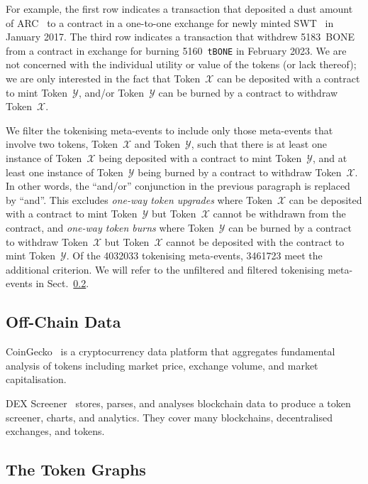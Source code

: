 For example, the first row indicates a transaction that deposited a
dust amount of ARC~\cite{arcade-city-xx} to a contract in a one-to-one
exchange for newly minted SWT~\cite{swarm-city-xx} in January 2017.
The third row indicates a transaction that withdrew
\num{5183}~{BONE}~\cite{shiba-inu-xx} from a contract in exchange for
burning \num{5160}~\texttt{tBONE} in February 2023.  We are not
concerned with the individual utility or value of the tokens (or lack
thereof); we are only interested in the fact that Token~$\mathcal{X}$
can be deposited with a contract to mint Token~$\mathcal{Y}$, and/or
Token~$\mathcal{Y}$ can be burned by a contract to withdraw
Token~$\mathcal{X}$.

We filter the tokenising meta-events to include only those meta-events
that involve two tokens, Token~$\mathcal{X}$ and Token~$\mathcal{Y}$,
such that there is at least one instance of Token~$\mathcal{X}$ being
deposited with a contract to mint Token~$\mathcal{Y}$, and at least
one instance of Token~$\mathcal{Y}$ being burned by a contract to
withdraw Token~$\mathcal{X}$.  In other words, the ``and/or''
conjunction in the previous paragraph is replaced by ``and''.  This
excludes \textit{one-way token upgrades} where Token~$\mathcal{X}$ can
be deposited with a contract to mint Token~$\mathcal{Y}$ but
Token~$\mathcal{X}$ cannot be withdrawn from the contract, and
\textit{one-way token burns} where Token~$\mathcal{Y}$ can be burned
by a contract to withdraw Token~$\mathcal{X}$ but Token~$\mathcal{X}$
cannot be deposited with the contract to mint Token~$\mathcal{Y}$.  Of
the \num{4032033} tokenising meta-events, \num{3461723} meet the
additional criterion.  We will refer to the unfiltered and filtered
tokenising meta-events in Sect.~\ref{sec:data-token-graphs}.

\subsection{Off-Chain Data}\label{sec:data-off-chain}

CoinGecko~\cite{gecko-labs-xx} is a cryptocurrency data platform that
aggregates fundamental analysis of tokens including market price,
exchange volume, and market capitalisation.

DEX Screener~\cite{dex-screener-xx} stores, parses, and analyses
blockchain data to produce a token screener, charts, and analytics.
They cover many blockchains, decentralised exchanges, and tokens.

\subsection{The Token Graphs}\label{sec:data-token-graphs}

